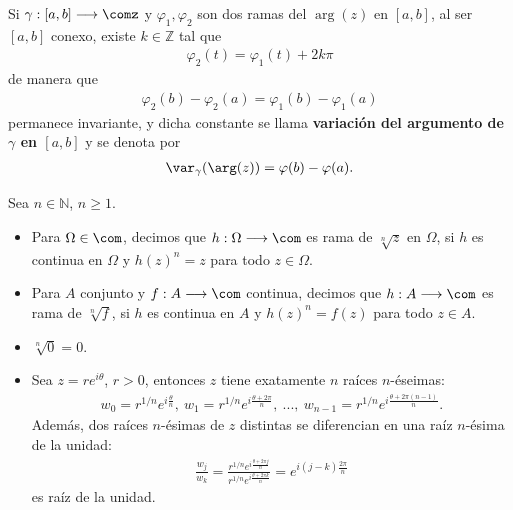 \begin{obs}
Si $\gamma : [a,b] \longrightarrow \comz$ y $\varphi_1,\varphi_2$ son dos ramas del $\arg(z)$ en $[a,b]$, al ser $[a,b]$ conexo, existe $k \in \mathbb{Z}$ tal que
\begin{align*}
    \varphi_2(t) = \varphi_1(t) + 2k\pi
\end{align*}
de manera que
\begin{align*}
    \varphi_2(b) - \varphi_2(a) = \varphi_1(b) - \varphi_1(a)
\end{align*}
permanece invariante, y dicha constante se llama \textbf{variación del argumento de $\gamma$ en $[a,b]$} y se denota por
\begin{align*}
    \var_{\gamma}(\arg(z)) = \varphi(b) - \varphi(a).
\end{align*}
\end{obs}
\begin{defi}
Sea $n \in \mathbb{N}$, $n \ge 1$. 
\begin{itemize}
    \item Para $\Omega \in \com$, decimos que $h : \Omega \longrightarrow \com$ es rama de $\sqrt[n]{z}$ en $\Omega$, si $h$ es continua en $\Omega$ y $h(z)^n = z$ para todo $z \in \Omega$.
    \item Para $A$ conjunto y $f: A \longrightarrow \com$ continua, decimos que $h : A \longrightarrow \com$ es rama de $\sqrt[n]{f}$, si $h$ es continua en $A$ y $h(z)^n = f(z)$ para todo $z \in A$.
\end{itemize}
\end{defi}

\begin{obs}
\begin{itemize}
    \item $\sqrt[n]{0} = 0$.
    \item Sea $z = re^{i\theta}$, $r > 0$, entonces $z$ tiene exatamente $n$ raíces $n$-éseimas:
    \begin{align*}
        w_0 = r^{1/n}e^{i\frac{\theta}{n}}, \ w_1 = r^{1/n}e^{i\frac{\theta + 2\pi}{n}}, \ ..., \ w_{n-1} = r^{1/n}e^{i\frac{\theta + 2\pi(n-1)}{n}}.
    \end{align*}
    Además, dos raíces $n$-ésimas de $z$ distintas se diferencian en una raíz $n$-ésima de la unidad:
    \begin{align*}
        \frac{w_j}{w_k} = \frac{r^{1/n}e^{i\frac{\theta + 2\pi j}{n}}}{r^{1/n}e^{i\frac{\theta + 2\pi k}{n}}} = e^{i(j - k)\frac{2\pi}{n}}
    \end{align*}
    es raíz de la unidad.
\end{itemize}
\end{obs}


